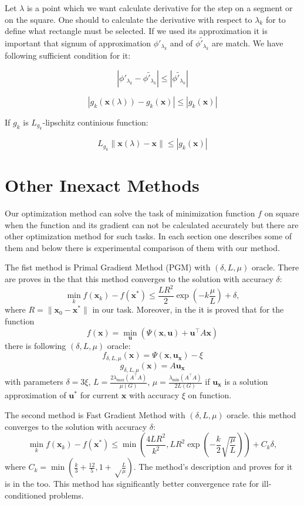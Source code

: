 \documentclass[12pt]{article}
\begin{document}
Let $\lambda$ is a point which we want calculate derivative for the step on a segment or on the square. One should to calculate the derivative with respect to $\lambda_k$ for to define what rectangle must be selected. If we used its approximation it is important that signum of approximation $\phi'_{\lambda_k}$ and of $\widetilde{\phi'_{\lambda_k}}$ are match. We have following sufficient condition for it:

$$|\phi'_{\lambda_k} - \widetilde{\phi'_{\lambda_k}}|\leq |\widetilde{\phi'_{\lambda_k}}|$$

$$|g_k(\textbf{x}(\lambda))-g_k(\textbf{x})|\leq |g_k(\textbf{x})|$$

If $g_k$ is $L_{g_k}$-lipschitz continious function:

$$L_{g_k}\|\textbf{x}(\lambda)-\textbf{x}\|\leq |g_k(\textbf{x})|$$


\section{Other Inexact Methods}
\label{Inexact}

Our optimization method can solve the task of minimization function $f$ on square when the function and its gradient can not be calculated accurately but there are other optimization method for such tasks. In each section one describes some of them and below there is experimental comparison of them with our method.

The fist method is Primal Gradient Method (PGM) with $(\delta, L,\mu)$ oracle. There are proves in the \cite{PGM} that this method converges to the solution with accuracy $\delta$:
$$\min_k f(\textbf{x}_k) - f(\textbf{x}^*) \leq \frac{LR^2}{2}\exp\left(-k\frac{\mu}{L}\right) + \delta,$$
where $R = \|\textbf{x}_0-\textbf{x}^*\|$ in our task. Moreover, in the \cite{PGM} it is proved that for the function
$$f(\textbf{x}) = \min\limits_\textbf{u} \left(\Psi(\textbf{x},\textbf{u}) + \textbf{u}^\top A\textbf{x}\right)$$
there is following $(\delta, L,\mu)$ oracle:
$$f_{\delta, L,\mu}(\textbf{x}) = \Psi(\textbf{x}, \textbf{u}_\textbf{x}) - \xi$$
$$g_{\delta, L,\mu}(\textbf{x}) = A\textbf{u}_\textbf{x}$$
with parameters $\delta = 3\xi$, $L = \frac{2\lambda_{\max}(A^\top A)}{\mu(G)}$, $\mu = \frac{\lambda_{\min}(A^\top A)}{2L(G)}$ if $\textbf{u}_\textbf{x}$ is a solution approximation of $\textbf{u}^*$ for current $\textbf{x}$ with accuracy $\xi$ on function.

The second method is Fast Gradient Method with $(\delta, L,\mu)$ oracle.
this method converges to the solution with accuracy $\delta$:
$$\min_k f(\textbf{x}_k) - f(\textbf{x}^*) \leq \min\left(\frac{4LR^2}{k^2}, LR^2\exp\left(-\frac{k}{2}\sqrt{\frac{\mu}{L}}\right)\right) + C_k\delta,$$
where $C_k = \min\left(\frac{k}{3}+\frac{12}{5}, 1+\sqrt\frac{L}{\mu}\right)$. The method's description and proves for it is in the \cite{PGM} too. This method has significantly better convergence rate for  ill-conditioned problems.
\end{document}
